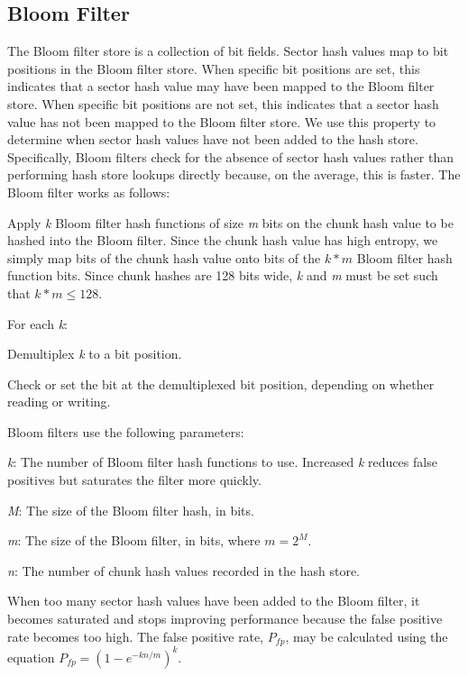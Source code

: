 \documentclass[12pt,twoside]{article}
\begin{document}
\subsection{Bloom Filter\label{tuning-bloom-filter}}
The Bloom filter store is a collection of bit fields.
Sector hash values map to bit positions in the Bloom filter store.
When specific bit positions are set,
this indicates that a sector hash value may have been mapped
to the Bloom filter store.
When specific bit positions are not set,
this indicates that a sector hash value has not been mapped
to the Bloom filter store.
We use this property to determine when sector hash values
have not been added to the hash store.
Specifically, Bloom filters check for the absence of sector hash values
rather than performing hash store lookups directly because, on the average, this is faster.
The Bloom filter works as follows:
\begin{compactenum}
\item Apply \emph{k} Bloom filter hash functions of size \emph{m} bits on the chunk hash value
to be hashed into the Bloom filter.
Since the chunk hash value has high entropy, we simply map bits of the chunk hash value
onto bits of the \begin{math}k*m\end{math} Bloom filter hash function bits.
Since chunk hashes are 128 bits wide, \emph{k} and \emph{m} must be set such that
\begin{math}k*m\le128\end{math}.
\item For each \emph{k}:
\begin{compactenum}
\item Demultiplex \emph{k} to a bit position.
\item Check or set the bit at the demultiplexed bit position,
depending on whether reading or writing.
\end{compactenum}
\end{compactenum}

Bloom filters use the following parameters:
\begin{compactitem}
\item \emph{k}: The number of Bloom filter hash functions to use.
Increased \emph{k} reduces false positives but saturates the filter more quickly.
\item \emph{M}: The size of the Bloom filter hash, in bits.
\item \emph{m}: The size of the Bloom filter, in bits, where \begin{math}m=2^{M}\end{math}.
\item \emph{n}: The number of chunk hash values recorded in the hash store.
\end{compactitem}
When too many sector hash values have been added to the Bloom filter,
it becomes saturated and stops improving performance
because the false positive rate becomes too high.
The false positive rate, \begin{math}P_{fp}\end{math}, may be calculated
using the equation \begin{math}P_{fp}=(1-e^{-kn/m})^k\end{math}.
\end{document}
